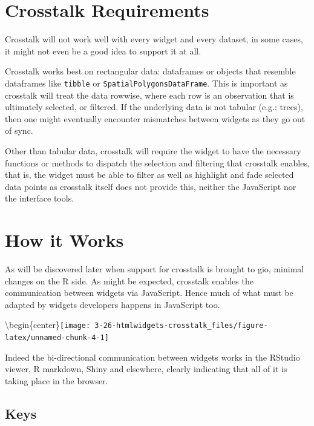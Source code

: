 \documentclass[
]{krantz}
\begin{document}
\hypertarget{linking-widgets-req}{%
\section{Crosstalk Requirements}\label{linking-widgets-req}}

Crosstalk will not work well with every widget and every dataset, in some cases, it might not even be a good idea to support it at all.

Crosstalk works best on rectangular data: dataframes or objects that resemble dataframes like \texttt{tibble} or \texttt{SpatialPolygonsDataFrame}. This is important as crosstalk will treat the data rowwise, where each row is an observation that is ultimately selected, or filtered. If the underlying data is not tabular (e.g.: trees), then one might eventually encounter mismatches between widgets as they go out of sync.

Other than tabular data, crosstalk will require the widget to have the necessary functions or methods to dispatch the selection and filtering that crosstalk enables, that is, the widget must be able to filter as well as highlight and fade selected data points as crosstalk itself does not provide this, neither the JavaScript nor the interface tools.

\hypertarget{linking-widgets-inner-workings}{%
\section{How it Works}\label{linking-widgets-inner-workings}}

As will be discovered later when support for crosstalk is brought to gio, minimal changes on the R side. As might be expected, crosstalk enables the communication between widgets via JavaScript. Hence much of what must be adapted by widgets developers happens in JavaScript too.

\textbackslash begin\{center\}\texttt{[image: 3-26-htmlwidgets-crosstalk\_files/figure-latex/unnamed-chunk-4-1]}

Indeed the bi-directional communication between widgets works in the RStudio viewer, R markdown, Shiny and elsewhere, clearly indicating that all of it is taking place in the browser.

\hypertarget{linking-widgets-keys}{%
\subsection{Keys}\label{linking-widgets-keys}}
\end{document}
